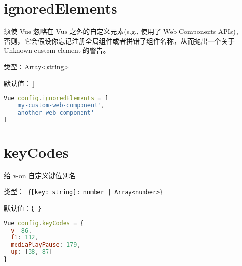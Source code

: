 \section{ignoredElements}

须使 Vue 忽略在 Vue 之外的自定义元素(e.g., 使用了 Web Components APIs)，否则，它会假设你忘记注册全局组件或者拼错了组件名称，从而抛出一个关于 Unknown custom element 的警告。

\begin{compactitem}
\item 类型：Array<string>
\item 默认值：[]
\end{compactitem}

\begin{lstlisting}[language=JavaScript]
Vue.config.ignoredElements = [
   'my-custom-web-component',
   'another-web-component'
]
\end{lstlisting}



\section{keyCodes}


给 v-on 自定义键位别名

\begin{compactitem}
\item 类型：\texttt{ \{[key: string]: number | Array<number>\} }
\item 默认值：\texttt{\{ \}}
\end{compactitem}



\begin{lstlisting}[language=JavaScript]
Vue.config.keyCodes = {
  v: 86,
  f1: 112,
  mediaPlayPause: 179,
  up: [38, 87]
}
\end{lstlisting}


